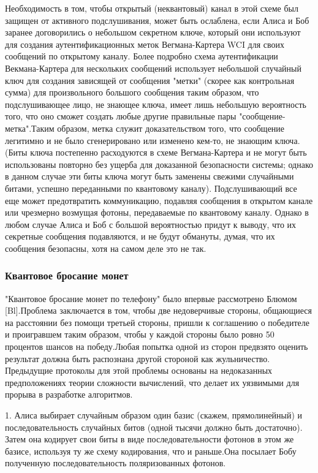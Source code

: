 ­­­­­­Необходимость в том, чтобы открытый (неквантовый) канал в этой схеме был защищен от активного подслушивания, может быть ослаблена, если Алиса и Боб заранее договорились о небольшом секретном ключе, который они используют для создания аутентификационных меток Вегмана-Картера WCI для своих сообщений по открытому каналу. Более подробно схема аутентификации Векмана-Картера для нескольких сообщений использует небольшой случайный ключ для создания зависящей от сообщения "метки" (скорее как контрольная сумма) для произвольного большого сообщения таким образом, что подслушивающее лицо, не знающее ключа, имеет лишь небольшую вероятность того, что оно сможет создать любые другие правильные пары "сообщение-метка".Таким образом, метка служит доказательством того, что сообщение легитимно и не было сгенерировано или изменено кем-то, не знающим ключа. (Биты ключа постепенно расходуются в схеме Вегмана-Картера и не могут быть использованы повторно без ущерба для доказанной безопасности системы; однако в данном случае эти биты ключа могут быть заменены свежими случайными битами, успешно переданными по квантовому каналу). Подслушивающий все еще может предотвратить коммуникацию, подавляя сообщения в открытом канале или чрезмерно возмущая фотоны, передаваемые по квантовому каналу. Однако в любом случае Алиса и Боб с большой вероятностью придут к выводу, что их секретные сообщения подавляются, и не будут обмануты, думая, что их сообщения безопасны, хотя на самом деле это не так.

\subsubsection{Квантовое бросание монет}

"Квантовое бросание ­­­­монет по телефону" было впервые рассмотрено Блюмом [Bl].Проблема заключается в том, чтобы две недоверчивые стороны, общающиеся на расстоянии без помощи третьей стороны, пришли к соглашению о победителе и проигравшем таким образом, чтобы у каждой стороны было ровно 50 процентов шансов на победу.Любая попытка одной из сторон предвзято оценить результат должна быть распознана другой стороной как жульничество. Предыдущие протоколы для этой проблемы основаны на недоказанных предположениях теории сложности вычислений, что делает их уязвимыми для прорыва в разработке алгоритмов.

­­1. Алиса выбирает случайным образом один базис (скажем, прямолинейный) и последовательность случайных битов (одной тысячи должно быть достаточно). Затем она кодирует свои биты в виде последовательности фотонов в этом же базисе, используя ту же схему кодирования, что и раньше.Она посылает Бобу полученную последовательность поляризованных фотонов.

